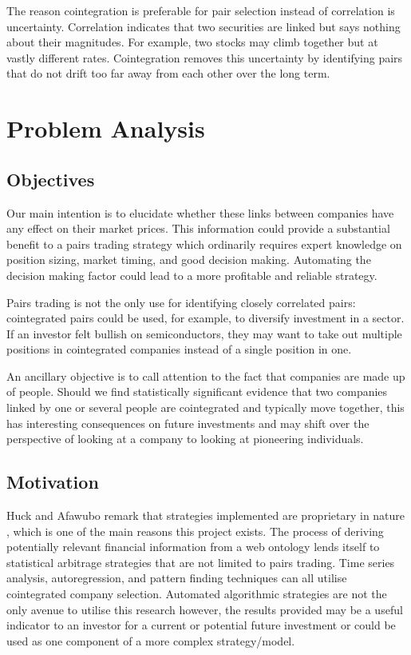 \documentclass{UoYCSproject}
\begin{document}
The reason cointegration is preferable for pair selection instead of correlation is uncertainty. Correlation indicates that two securities are linked but says nothing about their magnitudes. For example, two stocks may climb together but at vastly different rates. Cointegration removes this uncertainty by identifying pairs that do not drift too far away from each other over the long term.

\chapter{Problem Analysis}
\label{cha:Problem Analysis}

\section{Objectives}

Our main intention is to elucidate whether these links between companies have any effect on their market prices. This information could provide a substantial benefit to a pairs trading strategy which ordinarily requires expert knowledge on position sizing, market timing, and good decision making. Automating the decision making factor could lead to a more profitable and reliable strategy.

Pairs trading is not the only use for identifying closely correlated pairs: cointegrated pairs could be used, for example, to diversify investment in a sector. If an investor felt bullish on semiconductors, they may want to take out multiple positions in cointegrated companies instead of a single position in one.

An ancillary objective is to call attention to the fact that companies are made up of people. Should we find statistically significant evidence that two companies linked by one or several people are cointegrated and typically move together, this has interesting consequences on future investments and may shift over the perspective of looking at a company to looking at pioneering individuals. 

\section{Motivation}

Huck and Afawubo remark that strategies implemented are proprietary in nature \parencite{cointsupport}, which is one of the main reasons this project exists. The process of deriving potentially relevant financial information from a web ontology lends itself to statistical arbitrage strategies that are not limited to pairs trading. Time series analysis, autoregression, and pattern finding techniques can all utilise cointegrated company selection. Automated algorithmic strategies are not the only avenue to utilise this research however, the results provided may be a useful indicator to an investor for a current or potential future investment or could be used as one component of a more complex strategy/model.
\end{document}
